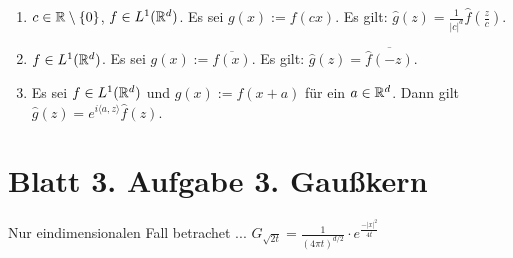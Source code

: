 \documentclass[
 ngerman]{report}
\begin{document}
\begin{enumerate}[1.]
\begin{proof}
		\textbf{Vorbereitung:}	
		
		Definiere: 
		$\phi: \R^d \times \R^d \to \R$, $ (x,z) \mapsto \vorfaktor 
		f(x)e^{-i \fop{z,x }} $
		
		Wir wollen dann soetwas haben:	

		$$\limes \int |\phi_n(x)| d\mu(x) = \int |\phi(x)| d\mu(x)$$

		Damit definieren wir: $\phi_n(x) := \phi_{z_n}(x) := \phi(x,z_n)$ 
		mit $(z_n)_{n\in \N} \in \R^d$

		Dann brauchen wir um den obrigen Satz anwenden zu können:
		
		\begin{enumerate}[(1)]
		  \item $\phi_n,\phi_z $ 
			\item Stetigkeit von $\phi_z(x)$  
		\end{enumerate}
	\end{proof}
	\item $c\in \mathbb{R} \setminus \left\{0\right\}$, $f\in L^1(\mathbb{R}^d)$. Es sei $g(x) := f(cx)$. 
		Es gilt: $\hat{g}(z) = \frac {1} {|c|^d} \hat{f} ( \frac {z} {c})$.
	\item $f \in L^1(\mathbb{R}^d)$. Es sei $g(x) := \overline{f(x)}$.
		Es gilt: $\hat{g}(z) = \overline{\hat{f}(-z)}$.
	\item Es sei $f\in L^1(\mathbb{R}^d)$ und $g(x) := f(x+a)$ für ein $a\in \mathbb{R}^d$.	
		Dann gilt $\hat{g}(z) = e^{i\langle a, z \rangle}\hat{f}(z)$.
\end{enumerate}
\section*{Blatt 3. Aufgabe 3. Gaußkern}
Nur eindimensionalen Fall betrachet ...
$G_{\sqrt{2t}} = \frac {1} {(4 \pi t)^{d/2}} 
\cdot e^{ \frac {-|x|^2} {4t}} $
\end{document}
